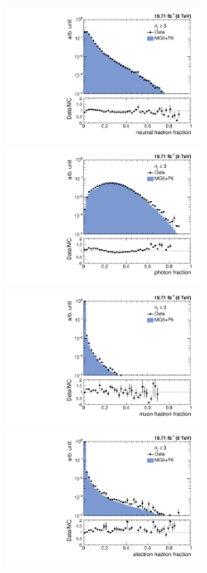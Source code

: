 \begin{figure}[!htbp]
 \begin{center}
 \vspace*{-1mm}
 \hspace*{-2mm}\includegraphics[width=0.51\textwidth]{Plots_HT_2_150/Comparison_NuHadFrac_3_HT_2_150.pdf}%
 ~~\includegraphics[width=0.51\textwidth]{Plots_HT_2_150/Comparison_PhFrac_3_HT_2_150.pdf}\\
 \vspace*{1mm}
 \hspace*{-2mm}\includegraphics[width=0.51\textwidth]{Plots_HT_2_150/Comparison_MuFrac_3_HT_2_150.pdf}%
 ~~\includegraphics[width=0.51\textwidth]{Plots_HT_2_150/Comparison_ElFrac_3_HT_2_150.pdf}\\

\end{center}
\end{figure}
